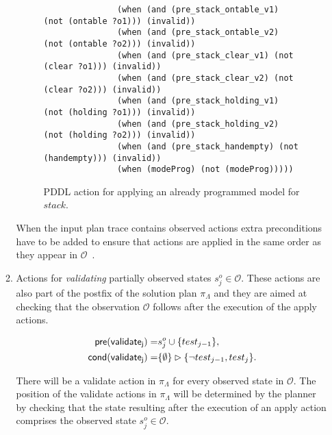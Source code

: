 \documentclass[runningheads]{llncs}
\newcommand{\pre}{\mathsf{pre}}     %
\newcommand{\cond}{\mathsf{cond}}   %
\begin{document}
\begin{itemize}
\begin{enumerate}
\begin{figure}[hbt!]
\begin{center}
\begin{scriptsize}
\begin{verbatim}
               (when (and (pre_stack_ontable_v1) (not (ontable ?o1))) (invalid))
               (when (and (pre_stack_ontable_v2) (not (ontable ?o2))) (invalid))
               (when (and (pre_stack_clear_v1) (not (clear ?o1))) (invalid))
               (when (and (pre_stack_clear_v2) (not (clear ?o2))) (invalid))
               (when (and (pre_stack_holding_v1) (not (holding ?o1))) (invalid))
               (when (and (pre_stack_holding_v2) (not (holding ?o2))) (invalid))
               (when (and (pre_stack_handempty) (not (handempty))) (invalid))
               (when (modeProg) (not (modeProg)))))
\end{verbatim}
\end{scriptsize}
 \caption{\small PDDL action for applying an already programmed model for $stack$.}
\label{fig:compilation}
\end{center}
\end{figure}


When the input plan trace contains observed actions extra preconditions have to be added to ensure that actions are applied in the same order as they appear in $\mathcal{O}$~\cite{aineto2018learning}.\\

\item Actions for {\em validating} partially observed states $s_j^o\in\mathcal{O}$. These actions are also part of the postfix of the solution plan $\pi_\Lambda$ and they are aimed at checking that the observation $\mathcal{O}$ follows after the execution of the apply actions.

\begin{small}
\begin{align*}
\hspace*{7pt}\pre(\mathsf{validate_{j}})=&s_j^o\cup\{test_{j-1}\},\\
\cond(\mathsf{validate_{j}})=&\{\emptyset\}\rhd\{\neg test_{j-1}, test_j\}.
\end{align*}
\end{small}

There will be a validate action in $\pi_\Lambda$ for every observed state in $\mathcal{O}$. The position of the validate actions in $\pi_\Lambda$ will be determined by the planner by checking that the state resulting after the execution of an apply action comprises the observed state $s_j^o\in\mathcal{O}$.

\end{enumerate}
\end{itemize}
\end{document}
